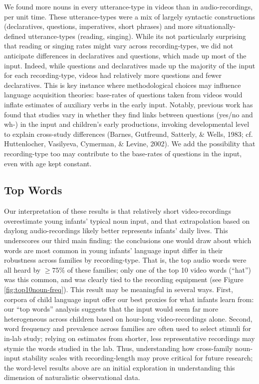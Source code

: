 \documentclass[man]{apa6}
\theoremstyle{definition}
\theoremstyle{definition}
\theoremstyle{definition}
\theoremstyle{remark}
\begin{document}
We found more nouns in every utterance-type in videos than in
audio-recordings, per unit time. These utterance-types were a mix of
largely syntactic constructions (declaratives, questions, imperatives,
short phrases) and more situationally-defined utterance-types (reading,
singing). While its not particularly surprising that reading or singing
rates might vary across recording-types, we did not anticipate
differences in declaratives and questions, which made up most of the
input. Indeed, while questions and declaratives made up the majority of
the input for each recording-type, videos had relatively more questions
and fewer declaratives. This is key instance where methodological
choices may influence language acquisition theories: base-rates of
questions taken from videos would inflate estimates of auxiliary verbs
in the early input. Notably, previous work has found that studies vary
in whether they find links between questions (yes/no and wh-) in the
input and children's early productions, invoking developmental level to
explain cross-study differences (Barnes, Gutfreund, Satterly, \& Wells,
1983; cf. Huttenlocher, Vasilyeva, Cymerman, \& Levine, 2002). We add
the possibility that recording-type too may contribute to the base-rates
of questions in the input, even with age kept constant.

\subsection{Top Words}\label{top-words}

Our interpretation of these results is that relatively short
video-recordings overestimate young infants' typical noun input, and
that extrapolation based on daylong audio-recordings likely better
represents infants' daily lives. This underscores our third main
finding: the conclusions one would draw about which words are most
common in young infants' language input differ in their robustness
across families by recording-type. That is, the top audio words were all
heard by \(\geq75\%\) of these families; only one of the top 10 video
words (\enquote{hat}) was this common, and was clearly tied to the
recording equipment (see Figure \ref{fig:top10noun-freq}). This result
may be meaningful in several ways. First, corpora of child language
input offer our best proxies for what infants learn from: our
\enquote{top words} analysis suggests that the input would seem far more
heterogeneous across children based on hour-long video-recordings alone.
Second, word frequency and prevalence across families are often used to
select stimuli for in-lab study; relying on estimates from shorter, less
representative recordings may stymie the words studied in the lab. Thus,
understanding how cross-family noun-input stability scales with
recording-length may prove critical for future research; the word-level
results above are an initial exploration in understanding this dimension
of naturalistic observational data.
\end{document}
